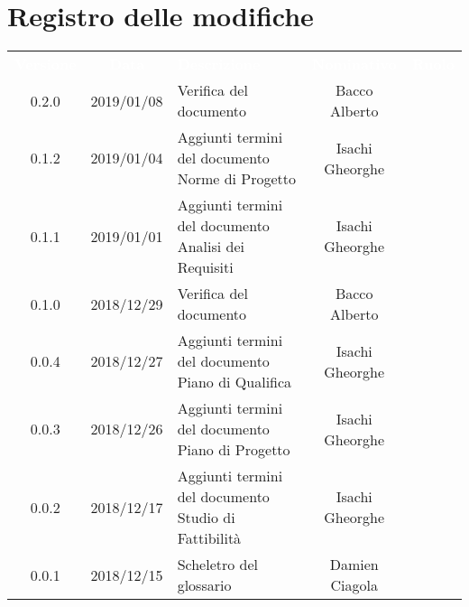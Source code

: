 
\section*{Registro delle modifiche}
{
	\renewcommand{\arraystretch}{1.5}
	\centering
	\begin{longtable}{ c c  C{4cm}  c  c }
		
		\textcolor{white}{\textbf{Versione}} & \textcolor{white}{\textbf{Data}} & \textcolor{white}{\textbf{Descrizione}} & \textcolor{white}{\textbf{Nominativo}} & \textcolor{white}{\textbf{Ruolo}}\\
						
		0.2.0 & 2019/01/08 & Verifica del documento & Bacco Alberto & \ver{}\\
		
		0.1.2 & 2019/01/04 & Aggiunti termini del documento Norme di Progetto & Isachi Gheorghe &\ana{}\\
		
		0.1.1 & 2019/01/01 & Aggiunti termini del documento Analisi dei Requisiti & Isachi Gheorghe &\ana{}\\
		
		0.1.0 & 2018/12/29 & Verifica del documento & Bacco Alberto & \ver{}\\
				
		0.0.4 & 2018/12/27 & Aggiunti termini del documento Piano di Qualifica & Isachi Gheorghe &\ana{}\\
				
		0.0.3 & 2018/12/26 &Aggiunti termini del documento Piano di Progetto & Isachi Gheorghe & \ana{}\\
				
		0.0.2 & 2018/12/17 & Aggiunti termini del documento Studio di Fattibilità & Isachi Gheorghe &\ana{}\\
		
		0.0.1 & 2018/12/15 & Scheletro del glossario & Damien Ciagola & \ana{}\\
		
	\end{longtable}

}
